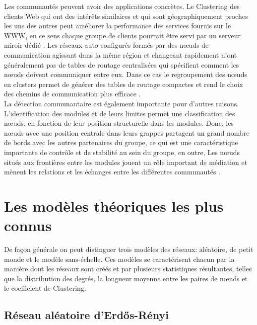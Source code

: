 Les communautés peuvent avoir des applications concrètes. Le Clustering des clients Web qui ont des intérêts similaires et qui sont géographiquement proches les uns des autres peut améliorer la performance des services fournis sur le WWW, en ce sens chaque groupe de clients pourrait être servi par un serveur miroir dédié \cite{KriW2000}.
Les réseaux auto-configurés formés par des nœuds de communication agissant dans la même région et changeant rapidement n'ont généralement pas de tables de routage centralisées qui spécifient comment les nœuds doivent communiquer entre eux.
Dans ce cas le regroupement des nœuds en clusters permet de générer des tables de routage compactes et rend le choix des chemins de communication plus efficace \cite{Steen2001}.\\
La détection communautaire est également importante pour d'autres raisons. L'identification des modules et de leurs limites permet une classification des nœuds, en fonction de leur position structurelle dans les modules. Donc, les nœuds avec une position centrale dans leurs grappes partagent un grand nombre de bords avec les autres partenaires du groupe, ce qui est une caractéristique importante de contrôle et de stabilité au sein du groupe, en outre, Les nœuds situés aux frontières entre les modules jouent un rôle important de médiation et mènent les relations et les échanges entre les différentes communautés \cite{Csermely2008}.

\section{Les modèles théoriques les plus connus} 

De façon générale on peut distinguer trois modèles des réseaux: aléatoire, de petit monde et le modèle sans-échelle. Ces modèles se caractérisent chacun par la manière dont les réseaux sont créés et par plusieurs statistiques résultantes, telles que la distribution des degrés, la longueur moyenne entre les paires de nœuds et le coefficient de Clustering.

   \subsection{Réseau aléatoire d'Erd\H{o}s-Rényi}
   
